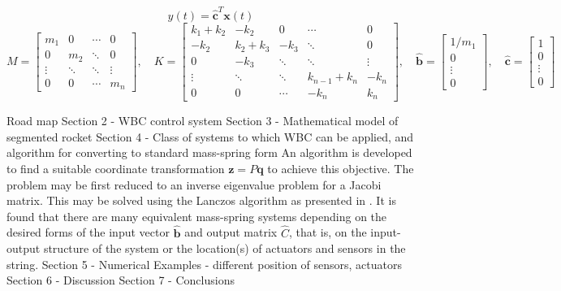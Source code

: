 \documentclass{mbd_fullpaper}
\begin{document}
\begin{equation}
y(t) = \mathbf{\hat{c}}^T \mathbf{x}(t)
\label{eq:eom2}
\end{equation}
\begin{equation}
M = \begin{bmatrix}
m_1  &  0 & \cdots & 0 \\
0 & m_2  & \ddots & 0 \\
\vdots & \ddots & \ddots & \vdots \\
0 & 0 & \cdots & m_n \end{bmatrix}
, \quad
K = \begin{bmatrix}
k_1+k_2  &  -k_2 & 0 & \cdots & 0 \\
-k_2 & k_2+k_3  & -k_3 & \ddots & 0 \\
0 & -k_3 & \ddots & \ddots & \vdots \\
\vdots & \ddots & \ddots & k_{n-1}+k_n & -k_{n} \\
0 & 0 & \cdots & -k_{n} & k_n \end{bmatrix}
,\quad \mathbf{\hat{b}} = \begin{bmatrix} {1}/{m_1} \\ 0 \\ \vdots \\ 0 \end{bmatrix}
,\quad \mathbf{\hat{c}} = \begin{bmatrix} 1 \\ 0 \\ \vdots \\ 0 \end{bmatrix}
\end{equation}



Road map
Section 2 - WBC control system
Section 3 - Mathematical model of segmented rocket
Section 4 - Class of systems to which WBC can be applied, and algorithm for converting to standard mass-spring form
An algorithm is developed to find a suitable coordinate transformation $\mathbf{z} = P \mathbf{q}$ to achieve this objective.
The problem may be first reduced to an inverse eigenvalue problem for a Jacobi matrix. This may be solved using the Lanczos algorithm as presented in \cite{gladwell1986inverse}. 
It is found that there are many equivalent mass-spring systems depending on the desired forms of the input vector $\hat{\mathbf{b}}$ and output matrix $\hat{C}$, that is, on the input-output structure of the system or the location(s) of actuators and sensors in the string.
Section 5 - Numerical Examples - different position of sensors, actuators
Section 6 - Discussion
Section 7 - Conclusions 
\end{document}
